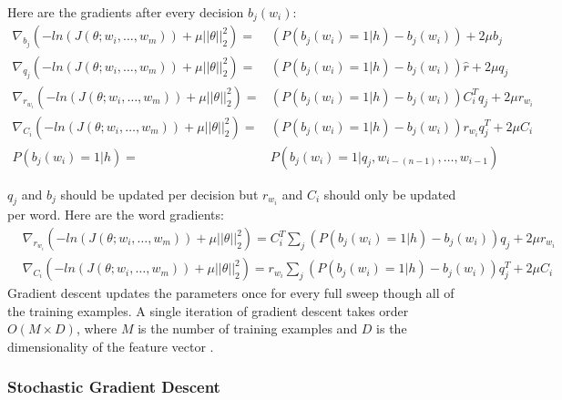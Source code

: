 Here are the gradients after every decision $b_j(w_i)$:
\begin{align}
\nabla_{b_j} \left( -ln(J(\theta;w_i,\dots, w_m)) +  \mu ||\theta||^2_2 \right)  = &  \left( P \left(b_j(w_i) = 1 | h \right) - b_j(w_i) \right) +2\mu b_j  \label{eq:gradients}
\\
\nabla_{q_j} \left( -ln(J(\theta;w_i,\dots, w_m)) +  \mu ||\theta||^2_2 \right)  = &\left( P \left(b_j(w_i) = 1 | h \right) - b_j(w_i) \right)\hat{r} +2\mu q_j \nonumber
\\
\nabla_{r_{w_i}} \left( -ln(J(\theta;w_i,\dots, w_m)) +  \mu ||\theta||^2_2 \right)  = & \left( P \left(b_j(w_i) = 1 | h \right) - b_j(w_i)\right) C_i^T q_j   +2\mu r_{w_i} \nonumber
\\
\nabla_{C_i} \left( -ln(J(\theta;w_i,\dots, w_m)) +  \mu ||\theta||^2_2 \right)  = &\left( P \left(b_j(w_i) = 1 | h \right) - b_j(w_i) \right) r_{w_i}q_j^T  +2\mu C_i \nonumber
\\
P \left(b_j(w_i) = 1 | h \right)= & P \left(b_j(w_i) = 1 | q_j, w_{i-(n-1)},\dots, w_{i-1} \right) \nonumber
\end{align}

$q_j$ and $b_j$ should be updated per decision but $r_{w_i}$ and $C_i$ should only be updated per word. Here are the word gradients:
\begin{align}
& \nabla_{r_{w_i}} \left( -ln(J(\theta;w_i,\dots, w_m)) +  \mu ||\theta||^2_2 \right)  =  C_i^T \sum_j \left( P \left(b_j(w_i) = 1 | h \right)  - b_j(w_i) \right)q_j +2\mu r_{w_i} \nonumber
\\
& \nabla_{C_i} \left( -ln(J(\theta;w_i,\dots, w_m)) +  \mu ||\theta||^2_2 \right)  =  r_{w_i} \sum_j \left( P \left(b_j(w_i) = 1 | h \right) - b_j(w_i) \right) q_j^T  +2\mu C_i
\end{align}
Gradient descent updates the parameters once for every full sweep though all of the training examples. A single iteration of gradient descent takes order $O(M\times D)$, where $M$ is the number of training examples and $D$ is the dimensionality of the feature vector \cite{Elkan2013}. 

\subsubsection{Stochastic Gradient Descent}
